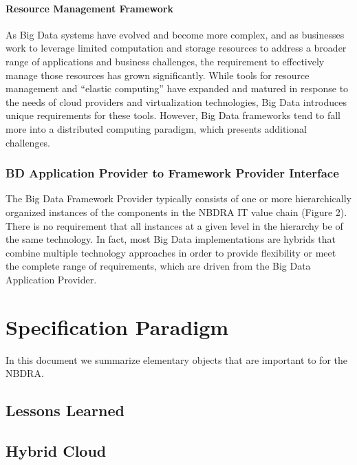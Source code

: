 \documentclass[10pt]{article}
\begin{document}
\paragraph{Resource Management Framework}

As Big Data systems have evolved and become more complex, and as
businesses work to leverage limited computation and storage resources
to address a broader range of applications and business challenges,
the requirement to effectively manage those resources has grown
significantly. While tools for resource management and “elastic
computing” have expanded and matured in response to the needs of cloud
providers and virtualization technologies, Big Data introduces unique
requirements for these tools. However, Big Data frameworks tend to
fall more into a distributed computing paradigm, which presents
additional challenges.

\subsubsection{BD Application Provider to Framework Provider
  Interface}

The Big Data Framework Provider typically consists of one or more
hierarchically organized instances of the components in the NBDRA IT
value chain (Figure 2). There is no requirement that all instances at
a given level in the hierarchy be of the same technology. In fact,
most Big Data implementations are hybrids that combine multiple
technology approaches in order to provide flexibility or meet the
complete range of requirements, which are driven from the Big Data
Application Provider.


	
\section{Specification Paradigm}

In this document we summarize elementary objects that are important to
for the NBDRA.

\subsection{Lessons Learned}


\subsection{Hybrid Cloud}
\end{document}
